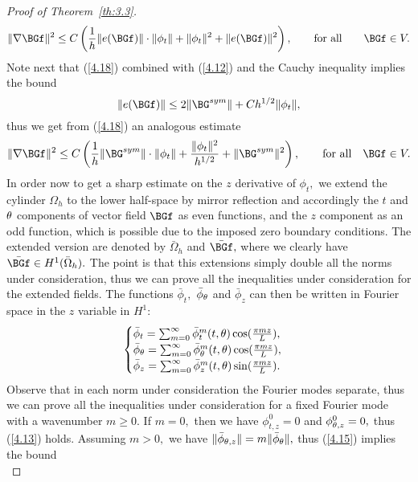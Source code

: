 \begin{proof}[Proof of Theorem~{\ref{th:3.3}}]
\begin{equation}
\label{4.18}
\|\nabla\BGf\|^2\leq C\left(\frac{1}{h}\|e(\BGf)\|\cdot\|\phi_t\|
+\|\phi_t\|^2+\|e(\BGf)\|^2\right),\qquad\text{for all}\qquad \BGf\in V.
\end{equation}
Note next that (\ref{4.18}) combined with (\ref{4.12}) and the Cauchy inequality implies the bound 
\begin{equation}
\label{4.19}
\|e(\BGf)\|\leq 2\|\BG^{sym}\|+ Ch^{1/2}\|\phi_t\|,
\end{equation}
thus we get from (\ref{4.18}) an analogous estimate 
\begin{equation}
\label{4.20}
\|\nabla\BGf\|^2\leq C\left(\frac{1}{h}\|\BG^{sym}\|\cdot\|\phi_t\|
+\frac{\|\phi_t\|^2}{h^{1/2}}+\|\BG^{sym}\|^2\right), \qquad\text{for all}\quad \BGf\in V.
\end{equation}
In order now to get a sharp estimate on the $z$ derivative of $\phi_t,$ we extend the cylinder $\Omega_h$ to the lower half-space by mirror reflection and accordingly the $t$ and $\theta$ components of vector field $\BGf$ as even functions, and the $z$ component as an odd function, which is possible due to the imposed zero boundary conditions. The extended version are denoted by $\bar\Omega_h$ and $\bar \BGf,$ where we clearly have $\bar\BGf\in H^1(\bar\Omega_h).$ 
The point is that this extensions simply double all the norms under consideration, thus we can prove all the inequalities under consideration for the extended fields. 
The functions $\bar\phi_t,$ $\bar\phi_\theta$ and $\bar\phi_z$ can then be written in Fourier space in the $z$ variable in $H^{1}:$ 
\begin{equation}
\label{4.21}
\begin{cases}
\bar \phi_t=\sum_{m=0}^\infty \bar \phi_t^m(t,\theta)\cos(\frac{\pi mz}{L}),\\
\bar \phi_\theta=\sum_{m=0}^\infty \bar \phi_\theta^m(t,\theta)\cos(\frac{\pi mz}{L}),\\
\bar \phi_z=\sum_{m=0}^\infty \bar \phi_z^m(t,\theta)\sin(\frac{\pi mz}{L}).
\end{cases}
\end{equation}
Observe that in each norm under consideration the Fourier modes separate, thus we can prove all the inequalities under consideration for a fixed Fourier mode with a
wavenumber $m \geq 0.$ If $m=0,$ then we have $\phi_{t,z}^0=0$ and $\phi_{\theta,z}^0=0,$ thus (\ref{4.13}) holds. Assuming $m>0,$ we have $\|\bar \phi_{\theta,z}\|=m\|\bar\phi_{\theta}\|,$
thus (\ref{4.15}) implies the bound 
\begin{equation}

\end{equation}
\end{proof}
